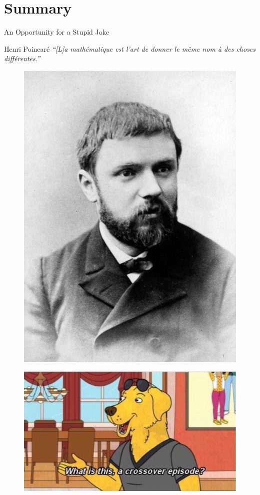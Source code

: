 \section{Summary}

\begin{frame}{An Opportunity for a Stupid Joke}
    \begin{block}{Henri Poincaré}
        \emph{``[L]a mathématique est l'art de donner le même nom à des choses différentes.''}
    \end{block}

\begin{figure}
\centering
\begin{minipage}{.5\textwidth}
  \centering
  \includegraphics[width=.5\linewidth]{resources/poincare.jpg}
  \label{fig:test1}
\end{minipage}%
\begin{minipage}{.5\textwidth}
  \centering
  \includegraphics[height=.6\linewidth]{resources/meme.jpg}
  \label{fig:test2}
\end{minipage}
\end{figure}

\end{frame}

